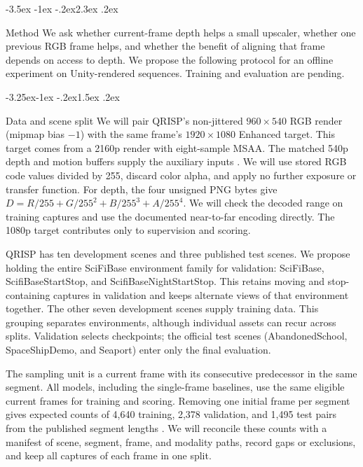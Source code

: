 \documentclass[11pt,a4paper]{article}
\makeatletter
\renewcommand\section{\@startsection{section}{1}{\z@}%
  {-3.5ex \@plus -1ex \@minus -.2ex}{2.3ex \@plus .2ex}%
  {\normalfont\Large\bfseries\raggedright}}
\renewcommand\subsection{\@startsection{subsection}{2}{\z@}%
  {-3.25ex\@plus -1ex \@minus -.2ex}{1.5ex \@plus .2ex}%
  {\normalfont\large\bfseries\raggedright}}
\makeatother
\begin{document}
\section{Method}
\label{sec:method}
We ask whether current-frame depth helps a small upscaler, whether one
previous RGB frame helps, and whether the benefit of aligning that frame
depends on access to depth. We propose the following protocol for an
offline experiment on Unity-rendered sequences. Training and evaluation
are pending.

\subsection{Data and scene split}
We will pair QRISP's non-jittered $960\times540$ RGB render (mipmap bias
$-1$) with the same frame's $1920\times1080$ Enhanced target. This target
comes from a 2160p render with eight-sample MSAA. The matched 540p depth
and motion buffers supply the auxiliary inputs
\cite[Supplement, Annex~A]{mercier2023efficient}.
We will use stored RGB code values divided by 255, discard color alpha,
and apply no further exposure or transfer function. For depth, the four
unsigned PNG bytes give
$D=R/255+G/255^2+B/255^3+A/255^4$.
We will check the decoded range on training captures and use the
documented near-to-far encoding directly. The 1080p target contributes
only to supervision and scoring.

QRISP has ten development scenes and three published test scenes. We
propose holding the entire SciFiBase environment family for validation:
SciFiBase, ScifiBaseStartStop, and ScifiBaseNightStartStop. This retains
moving and stop-containing captures in validation and keeps alternate
views of that environment together. The other seven development scenes
supply training data. This grouping separates environments, although
individual assets can recur across splits. Validation selects checkpoints;
the official test scenes (AbandonedSchool, SpaceShipDemo, and Seaport)
enter only the final evaluation.

The sampling unit is a current frame with its consecutive predecessor
in the same segment. All models, including the single-frame baselines,
use the same eligible current frames for training and scoring. Removing
one initial frame per segment gives expected counts of 4,640 training,
2,378 validation, and 1,495 test pairs from the published segment lengths
\cite[Supplement, Table~5]{mercier2023efficient}. We will reconcile these
counts with a manifest of scene, segment, frame, and modality paths,
record gaps or exclusions, and keep all captures of each frame in one split.
\end{document}
